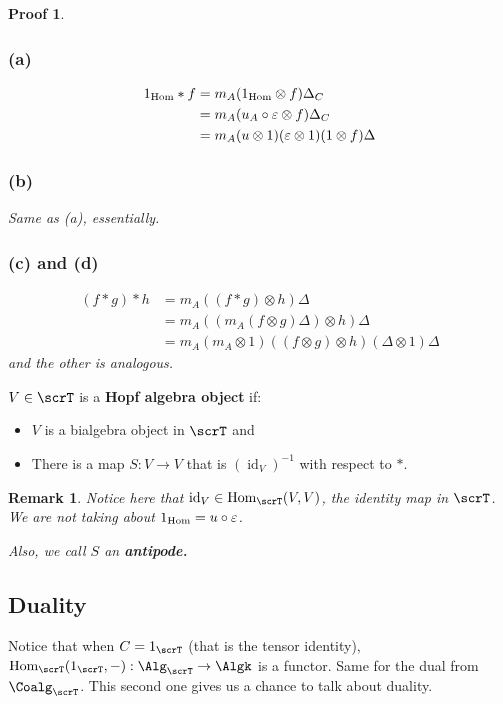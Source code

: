 \documentclass[12pt]{article}
\theoremstyle{break}
\theoremstyle{nonumberbreak}
\theoremstyle{changebreak}
\theoremstyle{break}
\theoremstyle{nonumberbreak}
\newtheorem{prf}{Proof}
\theoremstyle{nonumberplain}
\theoremstyle{change}
\newtheorem{rmk}[thm]{Remark}
\DeclareMathOperator{\id}{id}
\newcommand*{\Hom}{\ensuremath\text{Hom}}
\begin{document}
 \begin{prf}
	\subsubsection*{(a)}
	\begin{align*}
		1_{\Hom}\ast f&= m_A(1_{\Hom}\otimes f)\Delta_C\\
		&=m_A(u_A\circ\varepsilon\otimes f)\Delta_C\\
		&=m_A(u\otimes 1)(\varepsilon\otimes 1)(1\otimes f)\Delta
	\end{align*}
	\subsubsection*{(b)}
	Same as (a), essentially.
	\subsubsection*{(c) and (d)}
	\begin{align*}
		(f\ast g)\ast h&= m_A((f\ast g)\otimes h)\Delta\\
		&=m_A((m_A(f\otimes g)\Delta)\otimes h)\Delta\\
		&=m_A(m_A\otimes 1)((f\otimes g)\otimes h)(\Delta\otimes 1)\Delta
	\end{align*}
	and the other is analogous.
 \end{prf}

 \begin{defn}
	$V\in\scrT$ is a \textbf{Hopf algebra object} if:
	\begin{itemize}
		\item $V$ is a bialgebra object in $\scrT$ and
		\item There is a map $S:V\to V$ that is $(\id_V)^{-1}$ with respect to $\ast$.
	\end{itemize}
 \end{defn}
 \begin{rmk}
	Notice here that $\id_V\in\Hom_\scrT(V,V)$, the identity map in $\scrT$. We are \textit{not}
	taking about $1_{\Hom}=u\circ\varepsilon$.

	Also, we call $S$ an \textbf{antipode.}
 \end{rmk}

 \subsection{Duality}
 Notice that when $C=1_\scrT$ (that is the tensor identity), $\Hom_\scrT(1_\scrT,-):\Alg_\scrT\to\Algk$
 is a functor. Same for the dual from $\Coalg_\scrT$. This second one gives us a chance to talk about duality.
\end{document}
